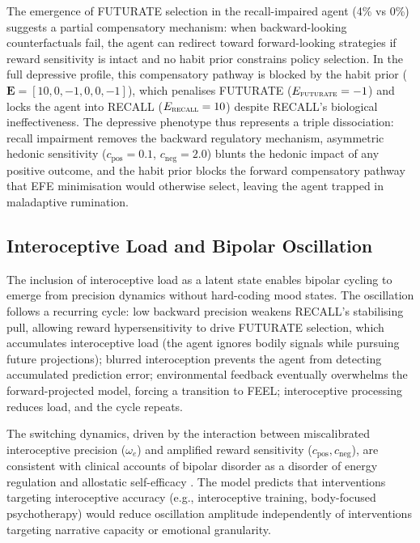 \documentclass[11pt,a4paper]{article}
\begin{document}
The emergence of FUTURATE selection in the recall-impaired agent (4\% vs 0\%) suggests a partial compensatory mechanism: when backward-looking counterfactuals fail, the agent can redirect toward forward-looking strategies if reward sensitivity is intact and no habit prior constrains policy selection. In the full depressive profile, this compensatory pathway is blocked by the habit prior ($\mathbf{E} = [10, 0, -1, 0, 0, -1]$), which penalises FUTURATE ($E_{\textsc{futurate}} = -1$) and locks the agent into RECALL ($E_{\textsc{recall}} = 10$) despite RECALL's biological ineffectiveness. The depressive phenotype thus represents a triple dissociation: recall impairment removes the backward regulatory mechanism, asymmetric hedonic sensitivity ($c_{\text{pos}} = 0.1$, $c_{\text{neg}} = 2.0$) blunts the hedonic impact of any positive outcome, and the habit prior blocks the forward compensatory pathway that EFE minimisation would otherwise select, leaving the agent trapped in maladaptive rumination.

\subsection{Interoceptive Load and Bipolar Oscillation}

The inclusion of interoceptive load as a latent state enables bipolar cycling to emerge from precision dynamics without hard-coding mood states. The oscillation follows a recurring cycle: low backward precision weakens RECALL's stabilising pull, allowing reward hypersensitivity to drive FUTURATE selection, which accumulates interoceptive load (the agent ignores bodily signals while pursuing future projections); blurred interoception prevents the agent from detecting accumulated prediction error; environmental feedback eventually overwhelms the forward-projected model, forcing a transition to FEEL; interoceptive processing reduces load, and the cycle repeats.

The switching dynamics, driven by the interaction between miscalibrated interoceptive precision ($\omega_e$) and amplified reward sensitivity ($c_{\text{pos}}, c_{\text{neg}}$), are consistent with clinical accounts of bipolar disorder as a disorder of energy regulation \citep{berk2007stages} and allostatic self-efficacy \citep{stephan2016allostatic}. The model predicts that interventions targeting interoceptive accuracy (e.g., interoceptive training, body-focused psychotherapy) would reduce oscillation amplitude independently of interventions targeting narrative capacity or emotional granularity.
\end{document}
